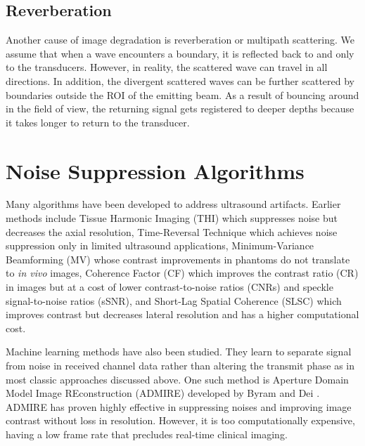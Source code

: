 \subsection{Reverberation}

Another cause of image degradation is reverberation or multipath scattering. We assume that when a wave encounters a boundary, it is reflected back to and only to the transducers. However, in reality, the scattered wave can travel in all directions. In addition, the divergent scattered waves can be further scattered by boundaries outside the ROI of the emitting beam. As a result of bouncing around in the field of view, the returning signal gets registered to deeper depths because it takes longer to return to the transducer.




\section{Noise Suppression Algorithms}

Many algorithms have been developed to address ultrasound artifacts. Earlier methods include Tissue Harmonic Imaging (THI) \cite{muir1980prediction, starritt1986development, humphrey2000nonlinear, cobbold2006foundations, anvari2015primer} which suppresses noise but decreases the axial resolution, Time-Reversal Technique \cite{fink1992time} which achieves noise suppression only in limited ultrasound applications, Minimum-Variance Beamforming (MV) \cite{synnevag2007adaptive, holfort2009broadband} whose contrast improvements in phantoms do not translate to \textit{in vivo} images, Coherence Factor (CF) \cite{mallart1994adaptive, hollman1999coherence} which improves the contrast ratio (CR) in images but at a cost of lower contrast-to-noise ratios (CNRs) and speckle signal-to-noise ratios (sSNR), and Short-Lag Spatial Coherence (SLSC) \cite{slsc} which improves contrast but decreases lateral resolution and has a higher computational cost.

Machine learning methods have also been studied. They learn to separate signal from noise in received channel data rather than altering the transmit phase as in most classic approaches discussed above. One such method is Aperture Domain Model Image REconstruction (ADMIRE) developed by Byram and Dei \cite{admire2015}. ADMIRE has proven highly effective in suppressing noises and improving image contrast without loss in resolution. However, it is too computationally expensive, having a low frame rate that precludes real-time clinical imaging.

